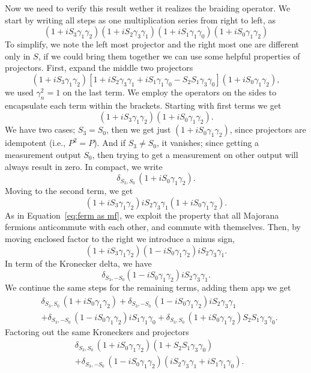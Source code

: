 \documentclass{article}
\begin{document}
Now we need to verify this result wether it realizes the braiding operator. We start by writing all steps as one multiplication series from right to left, as
\[
	(1 + iS_3 \gamma_1 \gamma_2) (1 + iS_2 \gamma_3 \gamma_1) (1 + iS_1 \gamma_1 \gamma_0) (1 + iS_0 \gamma_1 \gamma_2)
\]
To simplify, we note the left most projector and the right most one are different only in $ S $, if we could bring them together we can use some helpful properties of projectors. First, expand the middle two projectors
\[
	(1 + iS_3 \gamma_1 \gamma_2)
	[1 + iS_2 \gamma_3 \gamma_1 + iS_1 \gamma_1 \gamma_0 - S_2 S_1 \gamma_3 \gamma_0]
	(1 + iS_0 \gamma_1 \gamma_2),
\]
we used $ \gamma_n^2 = 1 $ on the last term. We employ the operators on the sides to encapsulate each term within the brackets. Starting with first terms we get
\[
	(1 + iS_3 \gamma_1 \gamma_2) (1 + iS_0 \gamma_1 \gamma_2).
\]
We have two cases; $ S_3 = S_0 $, then we get just $ (1 + iS_0 \gamma_1 \gamma_2) $, since projectors are idempotent (i.e., $ P^2 = P $). And if $ S_3 \ne S_0 $, it vanishes; since getting a measurement output $ S_0 $, then trying to get a measurement on other output will always result in zero. In compact, we write
\[
	\delta_{S_3, S_0} \, (1 + iS_0 \gamma_1 \gamma_2).
\]
Moving to the second term, we get
\[
	(1 + iS_3 \gamma_1 \gamma_2) iS_2 \gamma_3 \gamma_1 (1 + iS_0 \gamma_1 \gamma_2).
\]
As in Equation~\ref{eq:ferm as mf}, we exploit the property that all Majorana fermions anticommute with each other, and commute with themselves. Then, by moving enclosed factor to the right we introduce a minus sign,
\[
	(1 + iS_3 \gamma_1 \gamma_2)(1 - iS_0 \gamma_1 \gamma_2) iS_2 \gamma_3 \gamma_1 .
\]
In term of the Kronecker delta, we have
\[
	\delta_{S_3, -S_0}(1 - iS_0 \gamma_1 \gamma_2)iS_2 \gamma_3 \gamma_1 .
\]
We continue the same steps for the remaining terms, adding them app we get
\[
	\begin{aligned}
		 & \delta_{S_3, S_0} \, (1 + iS_0 \gamma_1 \gamma_2)
		+\delta_{S_3, -S_0}\, (1 - iS_0 \gamma_1 \gamma_2)iS_2 \gamma_3 \gamma_1    \\
		 & +\delta_{S_3, -S_0}\, (1 - iS_0 \gamma_1 \gamma_2)iS_1 \gamma_1 \gamma_0
		+\delta_{S_3, S_0}\, (1 + iS_0 \gamma_1 \gamma_2)S_2 S_1 \gamma_3 \gamma_0 .
	\end{aligned}
\]
Factoring out the same Kroneckers and projectors
\begin{equation}
	\begin{aligned}
		 & \delta_{S_3, S_0} \, (1 + iS_0 \gamma_1 \gamma_2)  ( 1 + S_2 S_1 \gamma_3 \gamma_0 )                    \\
		 & +\delta_{S_3, -S_0} \, (1 - iS_0 \gamma_1 \gamma_2) ( iS_2 \gamma_3 \gamma_1 +iS_1 \gamma_1 \gamma_0) .
	\end{aligned}
	\label{eq:seq 8 mfs}
\end{equation}
\end{document}
